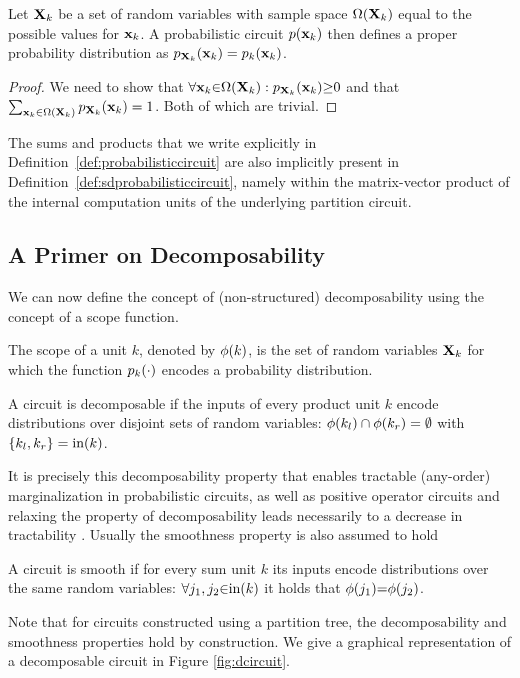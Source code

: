 \begin{proposition}
	Let $\mathbf{X}_k$ be a set of random variables with sample space $\Omega(\mathbf{X}_k)$ equal to the possible values for $\mathbf{x}_k$.
	A probabilistic circuit $p(\mathbf{x}_k)$ then defines a proper probability distribution as
	$
		p_{\mathbf{X}_k}(\mathbf{x}_k) = p_k (\mathbf{x}_k)
	$.
\end{proposition}

\begin{proof}
	We need to show that $\forall \mathbf{x}_k {\in} \Omega(\mathbf{X}_k): p_{\mathbf{X}_k}(\mathbf{x}_k){\geq} 0$ and that $\sum_{\mathbf{x}_k \in \Omega(\mathbf{X}_k)} p_{\mathbf{X}_k}(\mathbf{x}_k)=1$. Both of which are trivial.
\end{proof}


The sums and products that we write explicitly in Definition~\ref{def:probabilisticcircuit} are also implicitly present in Definition~\ref{def:sdprobabilisticcircuit}, namely within the matrix-vector product of the internal computation units of the underlying partition circuit.


\subsection{A Primer on Decomposability}







We can now define the concept of (non-structured) decomposability using the concept of a scope function.


\begin{definition}[Scope]
	\label{def:scope:cond}
	The scope of a unit $k$, denoted by $\phi(k)$, is the set of random variables $\mathbf{X}_k$ for which the function $p_k (\cdot)$ encodes a probability distribution.
\end{definition}

\begin{definition}[Decomposability]
	A circuit is decomposable if the inputs of every product unit
	$k$ encode distributions over disjoint sets of random variables:
	$\phi (k_l) \cap \phi (k_r) = \emptyset$ with $\{k_l, k_r\}= \text{in} (k)$.
\end{definition}

It is precisely this decomposability property that enables tractable (any-order) marginalization in probabilistic circuits, as well as positive operator circuits and relaxing the property of decomposability leads necessarily to a decrease in tractability \citep{choi2020probabilistic,vergari2021compositional,zuidberg2024probabilistic}. Usually the smoothness property is also assumed to hold
\begin{definition}[Smoothness]
	A circuit is smooth if for every sum unit $k$ its inputs encode distributions over the same random variables:
	$\forall j_1, j_2 {\in} \text{in}(k)$ it holds that $\phi(j_1){=}\phi(j_2) $.
\end{definition}
Note that for circuits constructed using a partition tree, the decomposability and smoothness properties hold by construction. We give a graphical representation of a decomposable circuit in Figure \ref{fig:dcircuit}.



